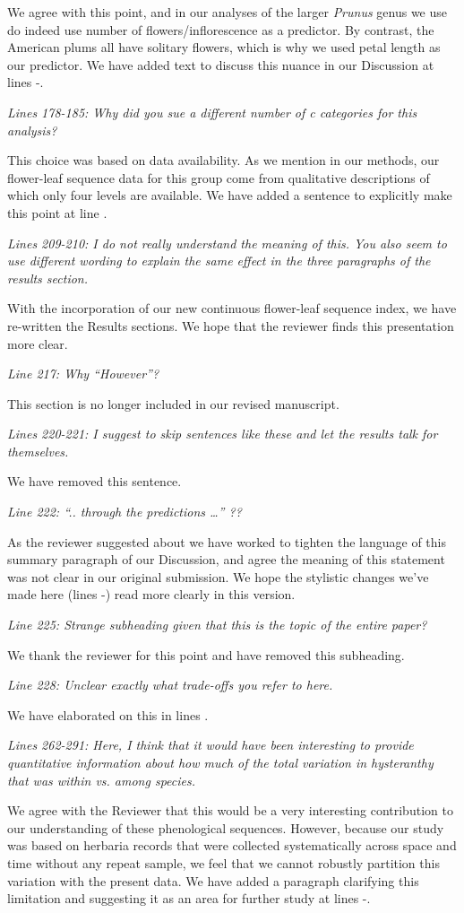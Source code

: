 \documentclass{article}[12pt]
\begin{document}
We agree with this point, and in our analyses of the larger \emph{Prunus} genus we use do indeed use number of flowers/inflorescence as a predictor. By contrast, the American plums all have solitary flowers, which is why we used petal length as our predictor. We have added text to discuss this nuance in our Discussion at lines -.

\emph{Lines 178-185: Why did you sue a different number of c categories for this analysis?}

This choice was based on data availability. As we mention in our methods, our flower-leaf sequence data for this group come from qualitative descriptions of which only four levels are available. We have added a sentence to explicitly make this point at line .

\emph{Lines 209-210: I do not really understand the meaning of this. You also seem to use different wording to explain the same effect in the three paragraphs of the results section.}

With the incorporation of our new continuous flower-leaf sequence index, we have re-written the Results sections. We hope that the reviewer finds this presentation more clear.

\emph{Line 217: Why “However”?}

This section is no longer included in our revised manuscript.

\emph{Lines 220-221: I suggest to skip sentences like these and let the results talk for themselves.}

We have removed this sentence.

\emph{Line 222: “.. through the predictions …” ??}

As the reviewer suggested about we have worked to tighten the language of this summary paragraph of our Discussion, and agree the meaning of this statement was not clear in our original submission. We hope the stylistic changes we've made here (lines -) read more clearly in this version.

\emph{Line 225: Strange subheading given that this is the topic of the entire paper?}

We thank the reviewer for this point and have removed this subheading.


\emph{Line 228: Unclear exactly what trade-offs you refer to here.}

We have elaborated on this in lines .

\emph{Lines 262-291: Here, I think that it would have been interesting to provide quantitative information about how much of the total variation in hysteranthy that was within vs. among species.}

We agree with the Reviewer that this would be a very interesting contribution to our understanding of these phenological sequences. However, because our study was based on herbaria records that were collected systematically across space and time without any repeat sample, we feel that we cannot robustly partition this variation with the present data. We have added a paragraph clarifying this limitation and suggesting it as an area for further study at lines -.  
\end{document}
